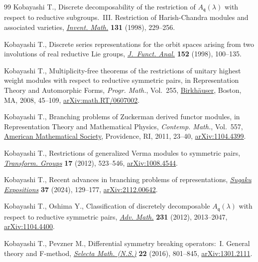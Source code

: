 \begin{thebibliography}{99}
Kobayashi T., Discrete decomposability of the restriction of
 {$A_{\mathfrak{q}}(\lambda)$} with respect to reductive subgroups.~{III}.
 {R}estriction of {H}arish-{C}handra modules and associated varieties,
 \href{https://doi.org/10.1007/s002220050203}{\textit{Invent. Math.}}
 \textbf{131} (1998), 229--256.

Kobayashi T., Discrete series representations for the orbit spaces arising from
 two involutions of real reductive {L}ie groups,
 \href{https://doi.org/10.1006/jfan.1997.3128}{\textit{J.~Funct. Anal.}}
 \textbf{152} (1998), 100--135.

Kobayashi T., Multiplicity-free theorems of the restrictions of unitary highest
 weight modules with respect to reductive symmetric pairs, in Representation
 Theory and Automorphic Forms, \textit{Progr. Math.}, Vol.~255,
 \href{https://doi.org/10.1007/978-0-8176-4646-2_3}{Birkh\"auser},
 Boston, MA, 2008, 45--109,
 \href{http://arxiv.org/abs/math.RT/0607002}{arXiv:math.RT/0607002}.

Kobayashi T., Branching problems of {Z}uckerman derived functor modules, in
 Representation Theory and Mathematical Physics, \textit{Contemp. Math.}, Vol.~557, \href{https://doi.org/10.1090/conm/557/11024}{American Mathematical
 Society}, Providence, RI, 2011, 23--40,
 \href{http://arxiv.org/abs/1104.4399}{arXiv:1104.4399}.

Kobayashi T., Restrictions of generalized {V}erma modules to symmetric pairs,
 \href{https://doi.org/10.1007/s00031-012-9180-y}{\textit{Transform. Groups}}
 \textbf{17} (2012), 523--546,
 \href{http://arxiv.org/abs/1008.4544}{arXiv:1008.4544}.

Kobayashi T., Recent advances in branching problems of representations,
 \href{https://doi.org/10.1090/suga/485}{\textit{Sugaku Expositions}}
 \textbf{37} (2024), 129--177,
 \href{http://arxiv.org/abs/2112.00642}{arXiv:2112.00642}.

Kobayashi T., Oshima Y., Classification of discretely decomposable
 {$A_{\mathfrak{q}}(\lambda)$} with respect to reductive symmetric pairs,
 \href{https://doi.org/10.1016/j.aim.2012.07.006}{\textit{Adv. Math.}}
 \textbf{231} (2012), 2013--2047,
 \href{http://arxiv.org/abs/1104.4400}{arXiv:1104.4400}.

Kobayashi T., Pevzner M., Differential symmetry breaking operators:~{I}.
 {G}eneral theory and {F}-method,
 \href{https://doi.org/10.1007/s00029-015-0207-9}{\textit{Selecta Math.
 (N.S.)}} \textbf{22} (2016), 801--845,
 \href{http://arxiv.org/abs/1301.2111}{arXiv:1301.2111}.


\end{thebibliography}
